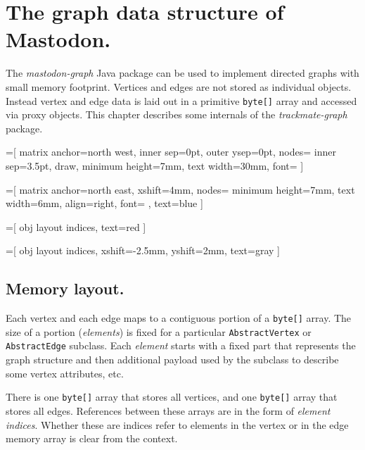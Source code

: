 \section{The graph data structure of Mastodon.}

The \emph{mastodon-graph} Java package can be used to implement directed graphs with small memory footprint.
Vertices and edges are not stored as individual objects.
Instead vertex and edge data is laid out in a primitive \texttt{byte[]} array and accessed via proxy objects.
This chapter describes some internals of the \emph{trackmate-graph} package.



=[
  	matrix anchor=north west,
		inner sep=0pt,
		outer ysep=0pt,
		nodes={
			inner sep=3.5pt,
			draw,
			minimum height=7mm,
			text width=30mm,
			font=\ttfamily
		}
	]
	
=[
  	matrix anchor=north east,
		xshift=4mm,
		nodes={
			minimum height=7mm,
			text width=6mm,
			align=right,
			font=\ttfamily
		},
		text=blue
	]
	
=[
		obj layout indices,
		text=red
	]
	
=[
		obj layout indices,
		xshift=-2.5mm,
		yshift=2mm,
		text=gray
	]


\subsection{Memory layout.}

Each vertex and each edge maps to a contiguous portion of a \texttt{byte[]} array.
The size of a portion (\emph{elements}) is fixed for a particular \texttt{AbstractVertex} or \texttt{AbstractEdge} subclass.
Each \emph{element} starts with a fixed part that represents the graph structure and then additional payload used by the subclass to describe some vertex attributes, etc.
 
There is one \texttt{byte[]} array that stores all vertices, and one \texttt{byte[]} array that stores all edges.
References between these arrays are in the form of \emph{element indices}.
Whether these are indices refer to elements in the vertex or in the edge memory array is clear from the context.

